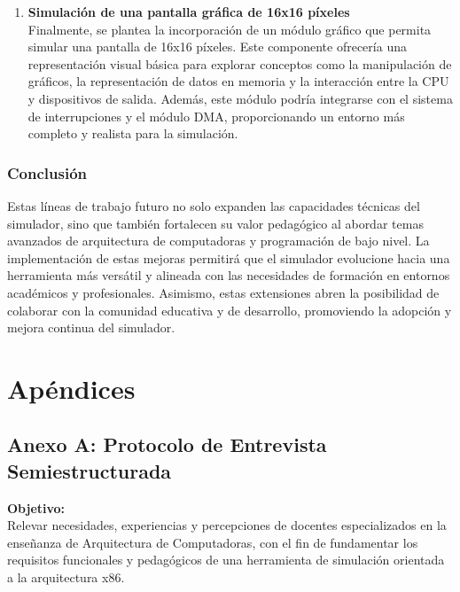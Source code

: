 \documentclass[12pt,oneside]{templates/unerthesis}
\begin{document}
\begin{enumerate}
\item
  \textbf{Simulación de una pantalla gráfica de 16x16 píxeles}\\
  Finalmente, se plantea la incorporación de un módulo gráfico que permita simular una pantalla de 16x16 píxeles. Este componente ofrecería una representación visual básica para explorar conceptos como la manipulación de gráficos, la representación de datos en memoria y la interacción entre la CPU y dispositivos de salida. Además, este módulo podría integrarse con el sistema de interrupciones y el módulo DMA, proporcionando un entorno más completo y realista para la simulación.
\end{enumerate}

\hypertarget{conclusiuxf3n}{%
\subsection{Conclusión}\label{conclusiuxf3n}}

Estas líneas de trabajo futuro no solo expanden las capacidades técnicas del simulador, sino que también fortalecen su valor pedagógico al abordar temas avanzados de arquitectura de computadoras y programación de bajo nivel. La implementación de estas mejoras permitirá que el simulador evolucione hacia una herramienta más versátil y alineada con las necesidades de formación en entornos académicos y profesionales. Asimismo, estas extensiones abren la posibilidad de colaborar con la comunidad educativa y de desarrollo, promoviendo la adopción y mejora continua del simulador.

\hypertarget{apuxe9ndices}{%
\chapter*{Apéndices}\label{apuxe9ndices}}

\hypertarget{anexoA}{%
\section{Anexo A: Protocolo de Entrevista Semiestructurada}\label{anexoA}}

\textbf{Objetivo:}\\
Relevar necesidades, experiencias y percepciones de docentes especializados en la enseñanza de Arquitectura de Computadoras, con el fin de fundamentar los requisitos funcionales y pedagógicos de una herramienta de simulación orientada a la arquitectura x86.
\end{document}
